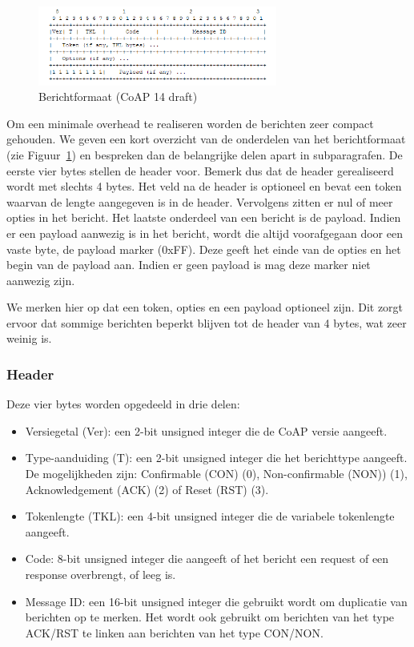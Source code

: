 \begin{figure}
\vspace{-20pt}
\includegraphics[width=0.7\textwidth]{fig/CoAPMessageFormat}
\vspace{-30pt}
\caption{Berichtformaat (CoAP 14 draft)}
\vspace{-10pt}
\label{fig:CoAPMessageFormat}
\end{figure}
Om een minimale overhead te realiseren worden de berichten zeer compact gehouden. We geven een kort overzicht van de onderdelen van het berichtformaat (zie Figuur~\ref{fig:CoAPMessageFormat}) en bespreken dan de belangrijke delen apart in subparagrafen. De eerste vier bytes stellen de header voor. Bemerk dus dat de header gerealiseerd wordt met slechts 4 bytes. Het veld na de header is optioneel en bevat een token waarvan de lengte aangegeven is in de header. Vervolgens zitten er nul of meer opties in het bericht.
Het laatste onderdeel van een bericht is de payload. Indien er een payload aanwezig is in het bericht, wordt die altijd voorafgegaan door een vaste byte, de payload marker (0xFF). Deze geeft het einde van de opties en het begin van de payload aan. Indien er geen payload is mag deze marker niet aanwezig zijn.

We merken hier op dat een token, opties en een payload optioneel zijn. Dit zorgt ervoor dat sommige berichten beperkt blijven tot de header van 4 bytes, wat zeer weinig is.

\subsubsection{Header}

Deze vier bytes worden opgedeeld in drie delen:
\begin{itemize}
\item Versiegetal (Ver): een 2-bit unsigned integer die de CoAP versie aangeeft. 
\item Type-aanduiding (T): een 2-bit unsigned integer die het berichttype aangeeft. De mogelijkheden zijn: Confirmable (CON)  (0), Non-confirmable (NON))  (1), Acknowledgement (ACK)  (2) of Reset (RST)  (3).
\item Tokenlengte (TKL): een 4-bit unsigned integer die de variabele tokenlengte aangeeft.
\item Code: 8-bit unsigned integer die aangeeft of het bericht een request of een response overbrengt, of leeg is.
\item Message ID: een 16-bit unsigned integer die gebruikt wordt om duplicatie van berichten op te merken. Het wordt ook gebruikt om berichten van het type ACK/RST te linken aan berichten van het type CON/NON.
\end{itemize}

